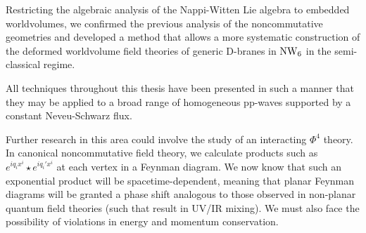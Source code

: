 Restricting the algebraic analysis of the Nappi-Witten Lie algebra to embedded
worldvolumes, we confirmed the previous analysis of the noncommutative
geometries and developed a method that allows a more systematic construction of
the deformed worldvolume field theories of generic D-branes in $\operatorname{NW}_6$ in the
semi-classical regime.

All techniques throughout this thesis have been presented in such a manner that
they may be applied to a broad range of homogeneous pp-waves supported by a
constant Neveu-Schwarz flux.

Further research in this area could involve the study of an interacting $\Phi^4$
theory. In canonical noncommutative field theory, we calculate products such as
$e^{iq_ix^i}\star e^{iq_i'x^i}$ at each vertex in a Feynman diagram. We now know
that such an exponential product will be spacetime-dependent, meaning that
planar Feynman diagrams will be granted a phase shift analogous to those
observed in non-planar quantum field theories (such that result in UV/IR
mixing). We must also face the possibility of violations in energy and momentum
conservation.

